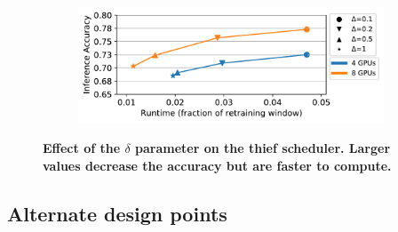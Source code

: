 \begin{figure}
  \centering
  \begin{subfigure}[t]{\linewidth}
    \centering
    \includegraphics[width=\linewidth]{results/sensitivity/sensitivity_delta_acc_runtime_cityscapes_48gpu.pdf}
  \end{subfigure}
  \caption{\bf Effect of the $\delta$ parameter on the thief scheduler. Larger values decrease the accuracy but are faster to compute.}
  \label{fig:sensitivity-delta}
\end{figure}


\subsection{Alternate design points}


